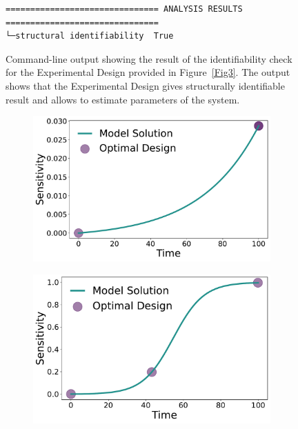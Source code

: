 \documentclass[graybox]{svmult}
\begin{document}
%
\begin{figure}
    \begin{verbatim}
=============================== ANALYSIS RESULTS ===============================
└─structural identifiability  True
    \end{verbatim}
    \caption{Command-line output showing the result of the identifiability check for the Experimental Design provided in Figure~\ref{Fig3}.
    The output shows that the Experimental Design gives structurally identifiable result and allows to estimate parameters of the system.}
    \label{Fig6}
\end{figure}
%
%
\begin{figure}[H]
    \begin{subfigure}{.5\textwidth}
      \centering
      \includegraphics[scale=0.25]{Figures/Fig7a.pdf}
    \end{subfigure}
    \begin{subfigure}{.5\textwidth}
        \centering
        \includegraphics[scale=0.25]{Figures/Fig7b.pdf}

\end{subfigure}
\end{figure}
\end{document}
